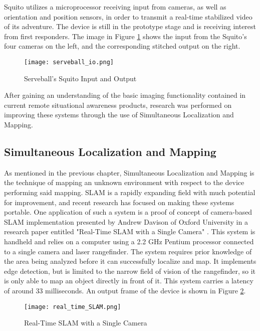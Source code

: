 Squito utilizes a microprocessor receiving input from cameras, as well as orientation and position sensors, in order to transmit a real-time stabilized video of its adventure. The device is still in the prototype stage and is receiving interest from first responders. The image in Figure \ref{squito_io} shows the input from the Squito's four cameras on the left, and the corresponding stitched output on the right.

\begin{figure}[H]
	\centerline{\texttt{[image: serveball\_io.png]}}
	\caption{Serveball's Squito Input and Output \cite{serveball}}
	\label{squito_io}
\end{figure}
\par
After gaining an understanding of the basic imaging functionality contained in current remote situational awareness products, research was performed on improving these systems through the use of Simultaneous Localization and Mapping. 

\subsection{Simultaneous Localization and Mapping}
As mentioned in the previous chapter, Simultaneous Localization and Mapping is the technique of mapping an unknown environment with respect to the device performing said mapping. SLAM is a rapidly expanding field with much potential for improvement, and recent research has focused on making these systems portable. One application of such a system is a proof of concept of camera-based SLAM implementation presented by Andrew Davison of Oxford University in a research paper entitled "Real-Time SLAM with a Single Camera" \cite{davison}. This system is handheld and relies on a computer using a 2.2 GHz Pentium processor connected to a single camera and laser rangefinder. The system requires prior knowledge of the area being analyzed before it can successfully localize and map. It implements edge detection, but is limited to the narrow field of vision of the rangefinder, so it is only able to map an object directly in front of it. This system carries a latency of around 33 milliseconds. An output frame of the device is shown in Figure \ref{rtSLAM}.

\begin{figure}[H]
	\centerline{\texttt{[image: real\_time\_SLAM.png]}}
	\caption{Real-Time SLAM with a Single Camera \cite{davison}}
	\label{rtSLAM}
\end{figure}

